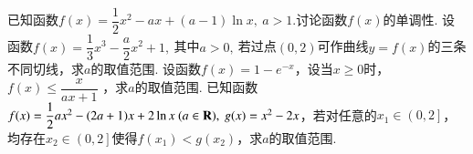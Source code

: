 \documentclass{BHCexam}
\begin{document}
\begin{questions}
\begin{parts}
\part 求$ a $的值；
\part 若对任意的$ x\in \left[0,+\infty \right) $，有$ f(x)\le kx^2 $成立，求实数$ k $的最小值.
\end{parts} 
\kongbai
\qs 已知函数$f(x)=\dfrac{ 1}{ 2}x^2-ax+(a-1)\ln x,~a>1.$讨论函数$f(x)$的单调性.
\newpage
\qs 设函数$f(x)=\dfrac{1}{3}x^3-\dfrac{a}{2}x^2+1,~$其中$ a>0,~ $若过点$ (0,2) $可作曲线$ y=f(x) $的三条不同切线，求$ a $的取值范围.
\kongbai
\qs 设函数$f(x)=1-e^{-x}$，设当$ x\ge0 $时，$f(x)\le\dfrac{x}{ax+1}$ ，求$ a $的取值范围.
\newpage
\qs 已知函数$f(x)=\dfrac{1}{2}ax^2-(2a+1)x+2\ln x~(a\in\mathbf{R}),~g(x)=x^2-2x$，若对任意的$ x_1\in\left(0,2\right] $，均存在$ x_2\in\left(0,2\right] $使得$ f(x_1)<g(x_2) $，求$ a $的取值范围.
\end{questions}
\end{document}
